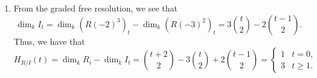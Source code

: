 \documentclass[letterpaper, 11pt, oneside]{book}
\begin{document}
\begin{sol}
\begin{enumerate}
    \item From the graded free resolution, we see that
          \[
            \dim_{k} I_{t} = \dim_{k}(R(-2)^{3})_{t} - \dim_{k}(R(-3)^{2})_{t} = 3 \binom{t}{2} - 2 \binom{t - 1}{2}.
          \]
          Thus, we have that
          \[
          H_{R / I}(t) = \dim_{k} R_{i} - \dim_{k} I_{t} = \binom{t + 2}{2} - 3 \binom{t}{2} + 2 \binom{t - 1}{2} = \begin{cases}
                                                                                                                      1 & t = 0, \\
                                                                                                                      3 & t \geq 1.
                                                                                                                    \end{cases}
          \]
  \end{enumerate}
\end{sol}

\clearpage
\end{document}
